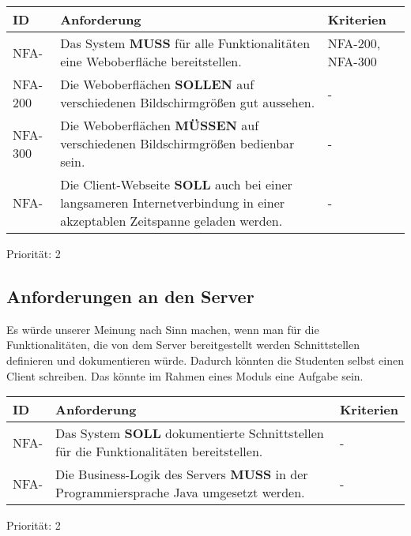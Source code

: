 \vspace{12pt}

\begin{tabular} {|p{}|p{11cm}|p{}|}
	\hline
	ID & Anforderung & Kriterien \\
	\hline
	NFA-
	& Das System \textbf{MUSS} für alle Funktionalitäten eine Weboberfläche bereitstellen. 
	& NFA-200, NFA-300 \\
	\hline
	NFA-200 
	& Die Weboberflächen \textbf{SOLLEN} auf verschiedenen Bildschirmgrößen gut aussehen.
	& -  \\
	\hline
	NFA-300
	& Die Weboberflächen \textbf{MÜSSEN} auf verschiedenen Bildschirmgrößen bedienbar sein.
	& - \\
	\hline
	NFA-
	& Die Client-Webseite \textbf{SOLL} auch bei einer langsameren Internetverbindung in einer akzeptablen Zeitspanne geladen werden.
	& - \\
	\hline
\end{tabular}
Priorität: 2

\newpage

\subsection{Anforderungen an den Server}
Es würde unserer Meinung nach Sinn machen, wenn man für die Funktionalitäten, die von dem Server bereitgestellt werden Schnittstellen definieren und dokumentieren würde. Dadurch könnten die Studenten selbst einen Client schreiben. Das könnte im Rahmen eines Moduls eine Aufgabe sein. 

\vspace{12pt}

\begin{tabular} {|p{}|p{11cm}|p{}|}
	\hline
	ID & Anforderung & Kriterien \\
	\hline
	NFA- 
	& Das System \textbf{SOLL} dokumentierte Schnittstellen für die Funktionalitäten bereitstellen.
	& - \\
	\hline
	NFA- 
	& Die Business-Logik des Servers \textbf{MUSS} in der Programmiersprache Java umgesetzt werden.
	& - \\
	\hline
\end{tabular}
Priorität: 2

